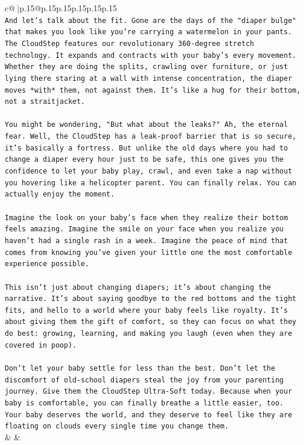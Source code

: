 \documentclass{article}
\begin{document}
{\begin{supertabular}{c@{$\;$}|p{.15\linewidth}@{}p{.15\linewidth}p{.15\linewidth}p{.15\linewidth}p{.15\linewidth}p{.15\linewidth}}
{{{\\ 
\texttt{And let's talk about the fit. Gone are the days of the "diaper bulge" that makes you look like you're carrying a watermelon in your pants. The CloudStep features our revolutionary 360{-}degree stretch technology. It expands and contracts with your baby's every movement. Whether they are doing the splits, crawling over furniture, or just lying there staring at a wall with intense concentration, the diaper moves *with* them, not against them. It's like a hug for their bottom, not a straitjacket.} \\
\\ 
\texttt{You might be wondering, "But what about the leaks?" Ah, the eternal fear. Well, the CloudStep has a leak{-}proof barrier that is so secure, it's basically a fortress. But unlike the old days where you had to change a diaper every hour just to be safe, this one gives you the confidence to let your baby play, crawl, and even take a nap without you hovering like a helicopter parent. You can finally relax. You can actually enjoy the moment.} \\
\\ 
\texttt{Imagine the look on your baby's face when they realize their bottom feels amazing. Imagine the smile on your face when you realize you haven't had a single rash in a week. Imagine the peace of mind that comes from knowing you've given your little one the most comfortable experience possible.} \\
\\ 
\texttt{This isn't just about changing diapers; it's about changing the narrative. It's about saying goodbye to the red bottoms and the tight fits, and hello to a world where your baby feels like royalty. It's about giving them the gift of comfort, so they can focus on what they do best: growing, learning, and making you laugh (even when they are covered in poop).} \\
\\ 
\texttt{Don't let your baby settle for less than the best. Don't let the discomfort of old{-}school diapers steal the joy from your parenting journey. Give them the CloudStep Ultra{-}Soft today. Because when your baby is comfortable, you can finally breathe a little easier, too. Your baby deserves the world, and they deserve to feel like they are floating on clouds every single time you change them.} \\
            }
        }
    }
    & & \\ \\


\end{supertabular}}
\end{document}
